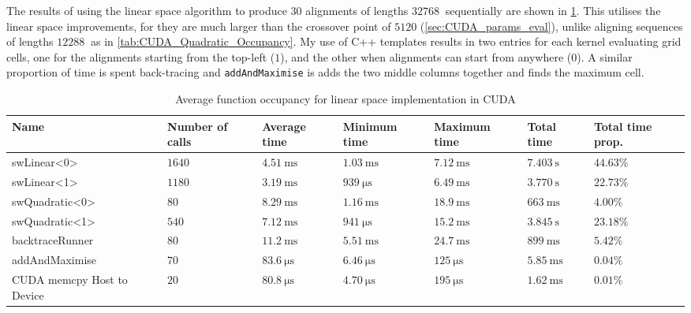 The results of using the linear space algorithm to produce $30$ alignments of lengths $\SI{32768}{}$ sequentially are shown in \cref{tab:CUDA_Linear_Occupancy}.
This utilises the linear space improvements, for they are much larger than the crossover point of $5120$ (\cref{sec:CUDA_params_eval}), unlike aligning sequences of lengths $\SI{12288}{}$ as in \cref{tab:CUDA_Quadratic_Occupancy}.
My use of C++ templates results in two entries for each kernel evaluating grid cells, one for the alignments starting from the top-left ($1$), and the other when alignments can start from anywhere ($0$).
A similar proportion of time is spent back-tracing and \lstinline{addAndMaximise} is adds the two middle columns together and finds the maximum cell.

\begin{table}
    \centering
    \begin{tabular}{|p{}|p{}p{}p{}p{}p{}p{}|} \hline
        Name & Number of calls & Average time & Minimum time & Maximum time & Total time  & Total time prop. \\ \hline
        {\ttfamily swLinear\textless0\textgreater} & $1640$ & $\SI{4.51}{\milli\s}$ & $\SI{1.03}{\milli\s}$   & $\SI{7.12}{\milli\s}$ & $\SI{7.403}{\s}$ & $44.63\%$ \\
        {\ttfamily swLinear\textless1\textgreater} & $1180$ & $\SI{3.19}{\milli\s}$ & $\SI{939}{\micro\s}$ & $\SI{6.49}{\milli\s}$ & $\SI{3.770}{\s}$ & $22.73\%$ \\
        {\ttfamily swQuadratic\textless0\textgreater} & $80$ & $\SI{8.29}{\milli\s}$ & $\SI{1.16}{\milli\s}$ & $\SI{18.9}{\milli\s}$ & $\SI{663}{\milli\s}$ & $4.00\%$ \\
        {\ttfamily swQuadratic\textless1\textgreater}& $540$ & $\SI{7.12}{\milli\s}$ & $\SI{941}{\micro\s}$ & $\SI{15.2}{\milli\s}$ & $\SI{3.845}{\s}$ & $23.18\%$ \\
        {\ttfamily backtraceRunner} & $80$ & $\SI{11.2}{\milli\s}$ & $\SI{5.51}{\milli\s}$ & $\SI{24.7}{\milli\s}$ & $\SI{899}{\milli\s}$ & $5.42\%$ \\
        {\ttfamily addAndMaximise} & $70$ & $\SI{83.6}{\micro\s}$ & $\SI{6.46}{\micro\s}$ & $\SI{125}{\micro\s}$ & $\SI{5.85}{\milli\s}$ & $0.04\%$ \\
        CUDA {\ttfamily memcpy} Host to Device & $20$ & $\SI{80.8}{\micro\s}$ & $\SI{4.70}{\micro\s}$ & $\SI{195}{\micro\s}$ & $\SI{1.62}{\milli\s}$ & $0.01\%$ \\ \hline
    \end{tabular}

    \caption{Average function occupancy for linear space implementation in CUDA}
    \label{tab:CUDA_Linear_Occupancy}
\end{table}

